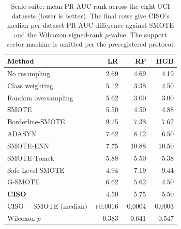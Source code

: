 \begin{table}[t]\centering
\caption{Scale suite: mean PR-AUC rank across the eight UCI datasets (lower is better). The final rows give CISO's median per-dataset PR-AUC difference against SMOTE and the Wilcoxon signed-rank $p$-value. The support vector machine is omitted per the preregistered protocol.}
\label{tab:scale-results}\footnotesize
\begin{tabular}{@{}lrrr@{}}\toprule
Method & LR & RF & HGB\\\midrule
No resampling & 2.69 & 4.69 & 4.19 \\
Class weighting & 5.12 & 3.38 & 4.50 \\
Random oversampling & 5.62 & 3.00 & 3.00 \\
SMOTE & 5.50 & 4.50 & 4.88 \\
Borderline-SMOTE & 9.75 & 7.38 & 7.62 \\
ADASYN & 7.62 & 8.12 & 6.50 \\
SMOTE-ENN & 7.75 & 10.88 & 10.50 \\
SMOTE-Tomek & 5.88 & 5.50 & 5.38 \\
Safe-Level-SMOTE & 4.94 & 7.19 & 9.44 \\
G-SMOTE & 6.62 & 5.62 & 4.50 \\
\textbf{CISO} & 4.50 & 5.75 & 5.50 \\
\midrule
CISO $-$ SMOTE (median) & +0.0016 & -0.0004 & -0.0003 \\
Wilcoxon $p$ & 0.383 & 0.641 & 0.547 \\
\bottomrule\end{tabular}\end{table}
